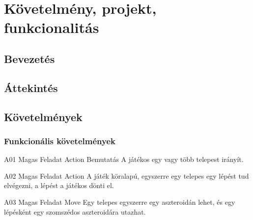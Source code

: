 \documentclass[../../projlab]{subfiles}
\begin{document}



\chapter{Követelmény, projekt, funkcionalitás}

\section{Bevezetés}




\section{Áttekintés}


\section{Követelmények}
\subsection{Funkcionális követelmények}


\begin{funkovetelmeny}
	{A01}
	{Magas}
	{Feladat}
	{Action}
	{Bemutatás}
	{A játékos egy vagy több telepest irányít.}
\end{funkovetelmeny}

\begin{funkovetelmeny}
	{A02}
	{Magas}
	{Feladat}
	{Action}
	{}
	{A játék köralapú, egyszerre egy telepes egy lépést tud elvégezni, a lépést a játékos dönti el.}
\end{funkovetelmeny}

\begin{funkovetelmeny}
	{A03}
	{Magas}
	{Feladat}
	{Move}
	{}
	{Egy telepes egyszerre egy aszteroidán lehet, és egy lépésként egy szomszédos aszteroidára utazhat.}
    
\end{funkovetelmeny}
\end{document}
